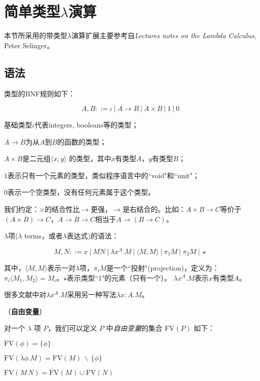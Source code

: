 \section{简单类型$\lambda$演算}

本节所采用的带类型$\lambda$演算扩展主要参考自\emph{Lectures notes on the Lambda Calculus}, Peter Selinger。

\subsection{语法}

类型的BNF规则如下：

$$A, B ::= \iota \ | \ A \to B \ | \ A \times B  \ | \ 1 \ | \ 0$$

\begin{tightenum}
  \item 基础类型$\iota$代表integers, booleans等的类型；
  \item $A \to B$为从$A$到$B$的函数的类型；
  \item $A \times B$是二元组$\langle x, y \rangle$ 的类型，其中$x$有类型$A$，$y$有类型$B$；
  \item $1$表示只有一个元素的类型，类似程序语言中的``void"和``unit"；
  \item $0$表示一个空类型，没有任何元素属于这个类型。
\end{tightenum}


我们约定：$\times$的结合性比$\to$更强，$\to$是右结合的。比如：$A \times B \to C$等价于$(A \times B) \to C$，$A \to B \to C$相当于$A \to (B \to C)$。


$\lambda$项($\lambda$ terms，或者$\lambda$表达式)的语法：

$$M, N ::= x \ | \ M N \ | \ \lambda x^A . M \ | \ \langle M, M \rangle \ | \ \pi_1 M \ | \ \pi_2 M \ | \ \star $$

其中，$\langle M, M \rangle$表示一对$\lambda$项，$\pi_i M$是一个``投射"(projection)，定义为：$\pi_i \langle M_1, M_2 \rangle = M_i$。$\star$表示类型``1"的元素（只有一个）。 $\lambda x^A. M$表示$x$有类型$A$。

\begin{rem}

很多文献中对$\lambda x^A. M$采用另一种写法$\lambda x:A. M$。
\end{rem}


\begin{defn} （\textbf{自由变量}）

  对一个 $\lambda$ 项 $P$，我们可以定义 $P$ 中\emph{自由变量}的集合
  $\text{FV}(P)$ 如下：
  \begin{tightenum}
  \item $\text{FV}(\phi) = \{\phi\}$
  \item $\text{FV}(\lambda\phi.M) = \text{FV}(M)\,\backslash\,\{\phi\}$\label{enum:fvforabs}
  \item $\text{FV}(M\,N) = \text{FV}(M)\cup\text{FV}(N)$
  \end{tightenum}

\end{defn}

